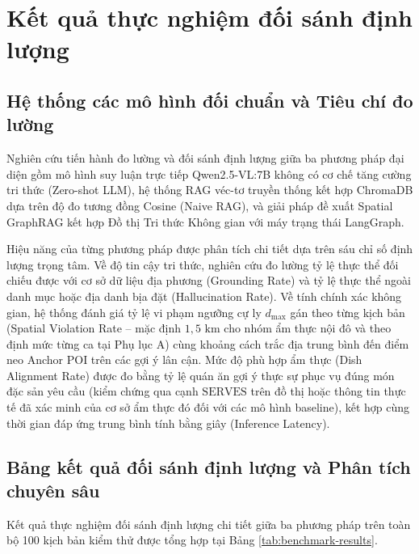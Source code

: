 \section{Kết quả thực nghiệm đối sánh định lượng}
\label{sec:ch2-results}

\subsection{Hệ thống các mô hình đối chuẩn và Tiêu chí đo lường}
\label{subsec:ch2-metrics}

Nghiên cứu tiến hành đo lường và đối sánh định lượng giữa ba phương pháp đại diện gồm mô hình suy luận trực tiếp Qwen2.5-VL:7B không có cơ chế tăng cường tri thức (Zero-shot LLM), hệ thống RAG véc-tơ truyền thống kết hợp ChromaDB dựa trên độ đo tương đồng Cosine (Naive RAG), và giải pháp đề xuất Spatial GraphRAG kết hợp Đồ thị Tri thức Không gian với máy trạng thái LangGraph.

Hiệu năng của từng phương pháp được phân tích chi tiết dựa trên sáu chỉ số định lượng trọng tâm. Về độ tin cậy tri thức, nghiên cứu đo lường tỷ lệ thực thể đối chiếu được với cơ sở dữ liệu địa phương (Grounding Rate) và tỷ lệ thực thể ngoài danh mục hoặc địa danh bịa đặt (Hallucination Rate). Về tính chính xác không gian, hệ thống đánh giá tỷ lệ vi phạm ngưỡng cự ly $d_{\max}$ gán theo từng kịch bản (Spatial Violation Rate -- mặc định $1{,}5\text{ km}$ cho nhóm ẩm thực nội đô và theo định mức từng ca tại Phụ lục A) cùng khoảng cách trắc địa trung bình đến điểm neo Anchor POI trên các gợi ý lân cận. Mức độ phù hợp ẩm thực (Dish Alignment Rate) được đo bằng tỷ lệ quán ăn gợi ý thực sự phục vụ đúng món đặc sản yêu cầu (kiểm chứng qua cạnh $\text{SERVES}$ trên đồ thị hoặc thông tin thực tế đã xác minh của cơ sở ẩm thực đó đối với các mô hình baseline), kết hợp cùng thời gian đáp ứng trung bình tính bằng giây (Inference Latency).

\subsection{Bảng kết quả đối sánh định lượng và Phân tích chuyên sâu}
\label{subsec:ch2-benchmark-table}

Kết quả thực nghiệm đối sánh định lượng chi tiết giữa ba phương pháp trên toàn bộ 100 kịch bản kiểm thử được tổng hợp tại Bảng \ref{tab:benchmark-results}.

